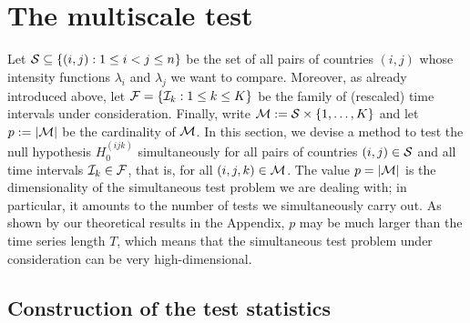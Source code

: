 \documentclass[a4paper,12pt]{article}
\numberwithin{equation}{section}
\begin{document}
 

\section{The multiscale test}\label{sec:test}


Let $\mathcal{S} \subseteq \{ (i,j): 1 \le i < j \le n \}$ be the set of all pairs of countries $(i,j)$ whose intensity functions $\lambda_i$ and $\lambda_j$ we want to compare. Moreover, as already introduced above, let $\mathcal{F} = \{ \mathcal{I}_k: 1 \le k \le K \}$ be the family of (rescaled) time intervals under consideration. Finally, write $\mathcal{M} := \mathcal{S} \times \{1,\ldots,K\}$ and let $p := |\mathcal{M}|$ be the cardinality of $\mathcal{M}$. In this section, we devise a method to test the null hypothesis $H_0^{(ijk)}$ simultaneously for all pairs of countries $(i,j) \in \mathcal{S}$ and all time intervals $\mathcal{I}_k \in \mathcal{F}$, that is, for all $(i,j,k) \in \mathcal{M}$. The value $p = |\mathcal{M}|$ is the dimensionality of the simultaneous test problem we are dealing with; in particular, it amounts to the number of tests we simultaneously carry out. As shown by our theoretical results in the Appendix, $p$ may be much larger than the time series length $T$, which means that the simultaneous test problem under consideration can be very high-dimensional. 


\subsection{Construction of the test statistics} 
\end{document}
